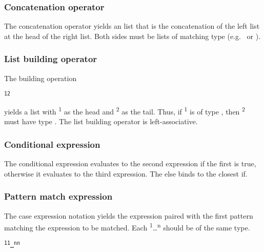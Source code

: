 \subsubsection{Concatenation operator} 
The concatenation operator yields an list that is the concatenation of the left list at the head of the right list. Both sides must be lists of matching type (e.g.~ or ). 
\begin{alltt}
\quad {}  
\end{alltt}

\subsubsection{List building operator}
The building operation
\begin{alltt}
\quad {}\textsuperscript{1} \term{::} \textsuperscript{2}
\end{alltt}
 yields a list with \textsuperscript{1} as the head and \textsuperscript{2} as the tail. Thus, if \textsuperscript{1} is of type , then \textsuperscript{2} must have type \term{[]}. The list building operator \term{::} is left-associative. 

\subsubsection{Conditional expression}
The conditional expression evaluates to the second expression if the first is true, otherwise it evaluates to the third expression. The else binds to the closest if.
\begin{alltt}
\quad {}     
\end{alltt}

\subsubsection{Pattern match expression}
The case expression notation yields the expression paired with the first pattern matching the expression to be matched. Each \textsuperscript{1}\dots {}\textsuperscript{n} should be of the same type.

\begin{alltt}
\quad {}   \textsuperscript{1} \term{->} \textsuperscript{1} \term{|} \dots \term{|} \textsuperscript{n} \term{->} \textsuperscript{n}
\end{alltt}

